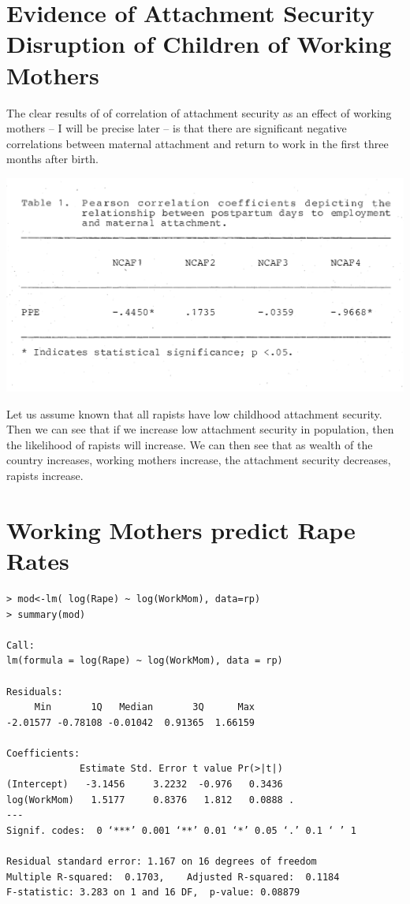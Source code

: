 \documentclass{amsart}
\begin{document}
\section{Evidence of Attachment Security Disruption of Children of Working Mothers}

The clear results of \cite{K89} of correlation of attachment security as an effect of working mothers -- I will be precise later -- is that there are significant negative correlations between maternal attachment and return to work in the first three months after birth.

\includegraphics[scale=0.3]{workmomattach.png}

Let us assume known that all rapists have low childhood attachment security.  Then we can see that if we increase low attachment security in population, then the likelihood of rapists will increase.  We can then see that as wealth of the country increases, working mothers increase, the  attachment security decreases, rapists increase.

\section{Working Mothers predict Rape Rates}

\begin{verbatim}
> mod<-lm( log(Rape) ~ log(WorkMom), data=rp)
> summary(mod)

Call:
lm(formula = log(Rape) ~ log(WorkMom), data = rp)

Residuals:
     Min       1Q   Median       3Q      Max 
-2.01577 -0.78108 -0.01042  0.91365  1.66159 

Coefficients:
             Estimate Std. Error t value Pr(>|t|)  
(Intercept)   -3.1456     3.2232  -0.976   0.3436  
log(WorkMom)   1.5177     0.8376   1.812   0.0888 .
---
Signif. codes:  0 ‘***’ 0.001 ‘**’ 0.01 ‘*’ 0.05 ‘.’ 0.1 ‘ ’ 1

Residual standard error: 1.167 on 16 degrees of freedom
Multiple R-squared:  0.1703,	Adjusted R-squared:  0.1184 
F-statistic: 3.283 on 1 and 16 DF,  p-value: 0.08879
\end{verbatim}


\begin{thebibliography}{CCC}
\end{thebibliography}
\end{document}
